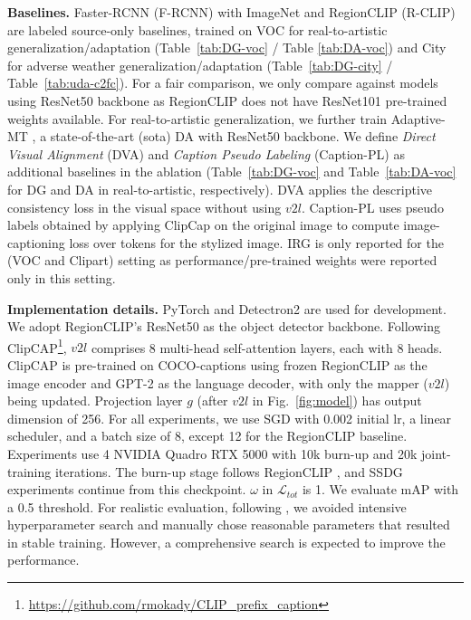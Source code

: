 \textbf{Baselines.}
\label{sec:baselines}
Faster-RCNN \cite{ren2015faster} (F-RCNN) with ImageNet \cite{deng2009imagenet} and RegionCLIP (R-CLIP) are labeled source-only baselines, trained on VOC for real-to-artistic generalization/adaptation (Table~\ref{tab:DG-voc} / Table \ref{tab:DA-voc}) and City for adverse weather generalization/adaptation (Table~\ref{tab:DG-city} / Table~\ref{tab:uda-c2fc}). For a fair comparison, we only compare against models using ResNet50 backbone as RegionCLIP \cite{zhong2022regionclip} does not have ResNet101 pre-trained weights available. For real-to-artistic generalization, we further train Adaptive-MT
\cite{li2022cross}, a state-of-the-art (sota) DA with ResNet50 backbone. We define \textit{Direct Visual Alignment} (DVA) and \textit{Caption Pseudo Labeling} (Caption-PL) as additional baselines in the ablation (Table~\ref{tab:DG-voc} and Table~\ref{tab:DA-voc} for DG and DA in real-to-artistic, respectively). DVA applies the descriptive consistency loss in the visual space without using $v2l$. Caption-PL uses pseudo labels obtained by applying ClipCap on the original image to compute image-captioning loss over tokens for the stylized image. IRG \cite{vs2022instance} is only reported for the (VOC and Clipart) setting 
as performance/pre-trained weights were reported only in this setting. 


\textbf{Implementation details.} PyTorch \cite{NEURIPS2019_9015} and Detectron2 \cite{wu2019detectron2} are used for development. We adopt RegionCLIP's ResNet50 \cite{he2016deep} as the object detector backbone. Following ClipCAP\footnote{\url{https://github.com/rmokady/CLIP_prefix_caption}}, $v2l$ comprises 8 multi-head self-attention layers, each with 8 heads. ClipCAP is pre-trained on COCO-captions \cite{chen2015microsoft,lin2014microsoft} using frozen RegionCLIP as the image encoder and GPT-2 as the language decoder, with only the mapper ($v2l$) being updated. Projection layer $g$ (after $\textit{v2l}$ in Fig.~\ref{fig:model}) has output dimension of 256. For all experiments, we use SGD with 0.002 initial lr, a linear scheduler, and a batch size of 8, except 12 for the RegionCLIP baseline. Experiments use 4 NVIDIA Quadro RTX 5000 with 10k burn-up and 20k joint-training iterations. The burn-up stage follows RegionCLIP \cite{zhong2022regionclip}, and SSDG experiments continue from this checkpoint. $\omega$ in $\mathcal{L}_{tot}$ is 1. We evaluate mAP with a 0.5 threshold. For realistic evaluation, following \cite{cct,oliver2018realistic}, we avoided intensive hyperparameter search and manually chose reasonable parameters that resulted in stable training. However, a comprehensive search is expected to improve the performance.
